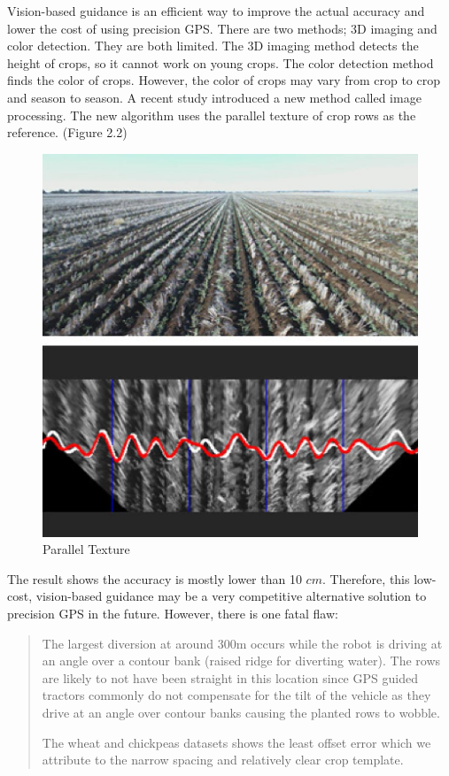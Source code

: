 Vision-based guidance is an efficient way to improve the actual accuracy and lower the cost of using precision GPS. There are two methods; 3D imaging and color detection. They are both limited. The 3D imaging method detects the height of crops, so it cannot work on young crops. The color detection method finds the color of crops. However, the color of crops may vary from crop to crop and season to season. A recent study introduced a new method called image processing. The new algorithm uses the parallel texture of crop rows as the reference. \cite{english2014vision} (Figure 2.2)

\begin{figure}[ht!]
\begin{center}
\includegraphics[scale = 0.45]{pics/parallel.jpg}
\caption{Parallel Texture}
\end{center}
\end{figure}

The result shows the accuracy is mostly lower than 10 $cm$. Therefore, this low-cost, vision-based guidance may be a very competitive alternative solution to precision GPS in the future. However, there is one fatal flaw: 
\begin{quote}
The largest diversion at around 300m occurs while the robot is driving at an angle over a contour bank (raised ridge for diverting water). The rows are likely to not have been straight in this location since GPS guided tractors commonly do not compensate for the tilt of the vehicle as they drive at an angle over contour banks causing the planted rows to wobble.

The wheat and chickpeas datasets shows the least offset error which we attribute to the narrow spacing and relatively clear crop template. \cite{english2014vision}
\end{quote}

